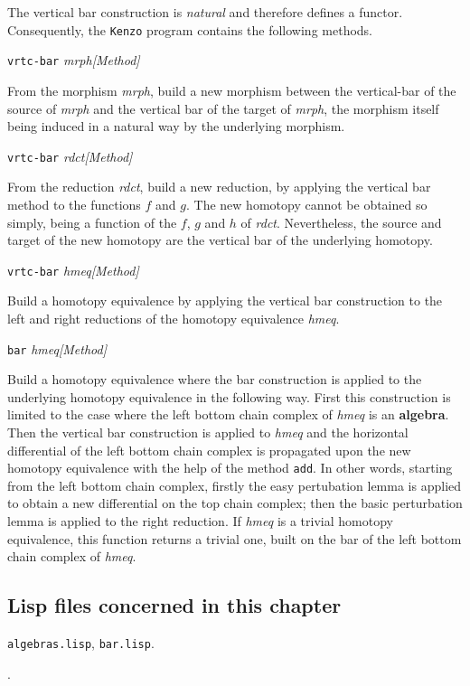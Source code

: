 The vertical bar construction is {\em natural} 
and therefore defines a functor. 
Consequently, the {\tt Kenzo} program contains the following methods.
\vskip 0.45cm
{\parindent=0mm
{\leftskip=5mm 
{\tt vrtc-bar} {\em mrph}\hfill {\em [Method]} \par}
{\leftskip=15mm 
From the morphism {\em mrph}, build a new morphism between the vertical-bar of the source
of {\em mrph} and the vertical bar of the target of {\em mrph}, the morphism itself being
induced in a natural way by the underlying morphism. \par}
{\leftskip=5mm 
{\tt vrtc-bar} {\em rdct}\hfill {\em [Method]} \par}
{\leftskip=15mm 
From the reduction {\em rdct}, build a new reduction, by applying the vertical bar
method to the functions $f$ and $g$. The new homotopy cannot be obtained so simply, being
a function of the $f$, $g$ and $h$ of {\em rdct}. Nevertheless, the source and target
of the new homotopy are the vertical bar of the underlying homotopy. \par}
{\leftskip=5mm 
{\tt vrtc-bar} {\em hmeq}\hfill {\em [Method]} \par}
{\leftskip=15mm 
Build a homotopy equivalence by applying the vertical bar cons\-truc\-ti\-on
to the left and right reductions of the homotopy equivalence {\em hmeq}. \par}
{\leftskip=5mm 
{\tt bar} {\em hmeq}\hfill {\em [Method]} \par}
{\leftskip=15mm 
Build a  homotopy equivalence where the bar construction is applied to the
underlying homotopy equivalence in the following way. First this construction is limited to the 
case where the left bottom chain complex of {\em hmeq} is an {\bf algebra}. Then the vertical bar
construction is applied to {\em hmeq} and the horizontal differential of the left bottom chain complex
is propagated upon the new homotopy equivalence with the help of the method {\tt add}. In other words,
starting from the left bottom chain complex, firstly the easy pertubation lemma is applied to
obtain a new differential on the top chain complex; then the basic perturbation lemma
is applied to the right reduction.
If {\em hmeq} is a trivial homotopy equivalence, this function returns a trivial one,
built on the bar of the left bottom chain complex of {\em hmeq}. \par}
}

\subsection* {Lisp files concerned in this chapter}

{\tt algebras.lisp}, {\tt bar.lisp}.
\par
[{\tt classes.lisp}, {\tt macros.lisp}, {\tt various.lisp}].
